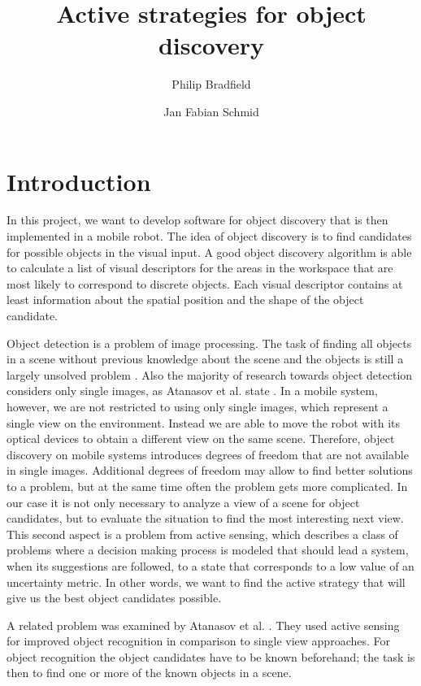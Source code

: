 \documentclass[a4paper,11pt,english]{article}
\begin{document}
\title{Active strategies for object discovery}
\author{Philip Bradfield \and Jan Fabian Schmid}
	
\maketitle 

\section{Introduction}
In this project, we want to develop software for object discovery that is then implemented in a mobile robot.
The idea of object discovery is to find candidates for possible objects in the visual input. A good object discovery algorithm is able to calculate a list of visual descriptors for the areas in the workspace that are most likely to correspond to discrete objects.
Each visual descriptor contains at least information about the spatial position and the shape of the object candidate.

Object detection is a problem of image processing. The task of finding all objects in a scene without previous knowledge about the scene and the objects is still a largely unsolved problem \cite{garcia2013computational}.
Also the majority of research towards object detection considers only single images, as Atanasov et al. state \cite{atanasov2014nonmyopic}.
In a mobile system, however, we are not restricted to using only single images, which represent a single view on the environment. Instead we are able to move the robot with its optical devices to obtain a different view on the same scene.
Therefore, object discovery on mobile systems introduces degrees of freedom that are not available in single images.
Additional degrees of freedom may allow to find better solutions to a problem, but at the same time often the problem gets more complicated.
In our case it is not only necessary to analyze a view of a scene for object candidates, but to evaluate the situation to find the most interesting next view.
This second aspect is a problem from active sensing, which describes a class of problems where a decision making process is modeled that should lead a system, when its suggestions are followed, to a state that corresponds to a low value of an uncertainty metric.
In other words, we want to find the active strategy that will give us the best object candidates possible.\medskip

A related problem was examined by Atanasov et al. \cite{atanasov2014nonmyopic}. They used active sensing for improved object recognition in comparison to single view approaches.
For object recognition the object candidates have to be known beforehand; the task is then to find one or more of the known objects in a scene.
\end{document}
